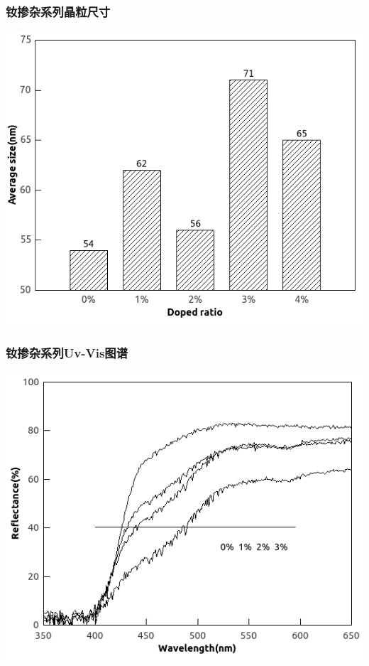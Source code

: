 \documentclass[xetex,compress]{mybeamer}
\begin{document}
\begin{frame}
\frametitle{钕掺杂系列晶粒尺寸}
\begin{block}{}
\centering
\includegraphics[scale=6]{figures/钕掺杂粒径大小.jpg} 
\end{block}
\end{frame}


\begin{frame}
\frametitle{钕掺杂系列Uv-Vis图谱}
\begin{block}{}
\centering
\includegraphics[scale=7]{figures/钕掺杂UV.jpg} 
\end{block}
\end{frame}
\end{document}
